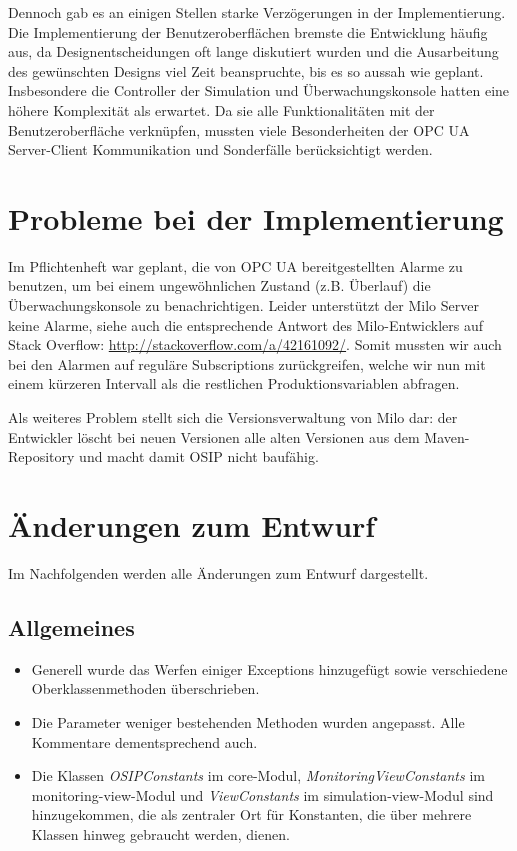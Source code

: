 \documentclass[parskip=full]{scrartcl}
\begin{document}
Dennoch gab es an einigen Stellen starke Verzögerungen in der Implementierung.
Die Implementierung der Benutzeroberflächen bremste die Entwicklung häufig aus, da Designentscheidungen oft lange
diskutiert wurden und die Ausarbeitung des gewünschten Designs viel Zeit beanspruchte, bis es so aussah wie geplant.
Insbesondere die Controller der Simulation und Überwachungskonsole hatten eine höhere Komplexität als erwartet.
Da sie alle Funktionalitäten mit der Benutzeroberfläche verknüpfen, mussten viele Besonderheiten der OPC UA Server-Client Kommunikation und Sonderfälle berücksichtigt werden.

\section{Probleme bei der Implementierung}
Im Pflichtenheft war geplant, die von OPC UA bereitgestellten Alarme zu benutzen, um bei einem ungewöhnlichen Zustand (z.B. Überlauf)
die Überwachungskonsole zu benachrichtigen. Leider unterstützt der Milo Server keine Alarme, siehe auch die entsprechende Antwort
des Milo-Entwicklers auf Stack Overflow: \href{http://stackoverflow.com/a/42161092/}{http://stackoverflow.com/a/42161092/}.
Somit mussten wir auch bei den Alarmen auf reguläre Subscriptions zurückgreifen, welche wir nun mit einem kürzeren Intervall
als die restlichen Produktionsvariablen abfragen.

Als weiteres Problem stellt sich die Versionsverwaltung von Milo dar: der Entwickler löscht bei neuen Versionen alle alten Versionen aus dem Maven-Repository und macht damit OSIP nicht baufähig.

\section{Änderungen zum Entwurf}
Im Nachfolgenden werden alle Änderungen zum Entwurf dargestellt.

\subsection{Allgemeines}
\begin{itemize}
 \item Generell wurde das Werfen einiger Exceptions hinzugefügt sowie verschiedene Oberklassenmethoden überschrieben.
 \item Die Parameter weniger bestehenden Methoden wurden angepasst. Alle Kommentare dementsprechend auch.
 \item Die Klassen \emph{OSIPConstants} im core-Modul, \emph{MonitoringViewConstants} im monitoring-view-Modul und \emph{ViewConstants} im simulation-view-Modul sind hinzugekommen, die als zentraler Ort für Konstanten, die über mehrere Klassen hinweg gebraucht werden, dienen.
\end{itemize}
\end{document}
